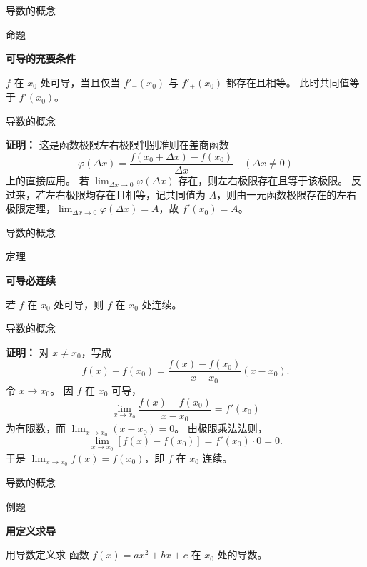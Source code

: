 \documentclass[aspectratio=169,10pt,fontset=fandol]{ctexbeamer}
\begin{document}
\begin{frame}[t,fragile]{导数的概念}
\footnotesize
\begin{block}{命题}
{\footnotesize
\textbf{可导的充要条件}\par

$f$ 在 $x_0$ 处可导，当且仅当 $f'_-(x_0)$ 与 $f'_+(x_0)$ 都存在且相等。 此时共同值等于 $f'(x_0)$。

}
\end{block}
\end{frame}
\begin{frame}[t,fragile]{导数的概念}
\footnotesize
{\footnotesize
\textbf{证明：}
这是函数极限左右极限判别准则在差商函数
\[
\varphi(\Delta x)=\frac{f(x_0+\Delta x)-f(x_0)}{\Delta x}\quad(\Delta x\neq0)
\]
上的直接应用。 若 $\lim_{\Delta x\to0}\varphi(\Delta x)$ 存在，则左右极限存在且等于该极限。 反过来，若左右极限均存在且相等，记共同值为 $A$，则由一元函数极限存在的左右极限定理，$\lim_{\Delta x\to0}\varphi(\Delta x)=A$，故 $f'(x_0)=A$。

}
\end{frame}
\begin{frame}[t,fragile]{导数的概念}
\footnotesize
\begin{block}{定理}
{\footnotesize
\textbf{可导必连续}\par

若 $f$ 在 $x_0$ 处可导，则 $f$ 在 $x_0$ 处连续。

}
\end{block}
\end{frame}
\begin{frame}[t,fragile]{导数的概念}
\footnotesize
{\footnotesize
\textbf{证明：}
对 $x\neq x_0$，写成
\[
f(x)-f(x_0)=\frac{f(x)-f(x_0)}{x-x_0}(x-x_0).
\]
令 $x\to x_0$。 因 $f$ 在 $x_0$ 可导，
\[
\lim_{x\to x_0}\frac{f(x)-f(x_0)}{x-x_0}=f'(x_0)
\]
为有限数，而 $\lim_{x\to x_0}(x-x_0)=0$。 由极限乘法法则，
\[
\lim_{x\to x_0}[f(x)-f(x_0)]=f'(x_0)\cdot0=0.
\]
于是 $\lim_{x\to x_0}f(x)=f(x_0)$，即 $f$ 在 $x_0$ 连续。

}
\end{frame}
\begin{frame}[t,fragile]{导数的概念}
\footnotesize
\begin{block}{例题}
{\footnotesize
\textbf{用定义求导}\par

用导数定义求 函数 $f(x) = ax^2 + bx + c$ 在 $x_0$ 处的导数。

}
\end{block}
\end{frame}
\end{document}
